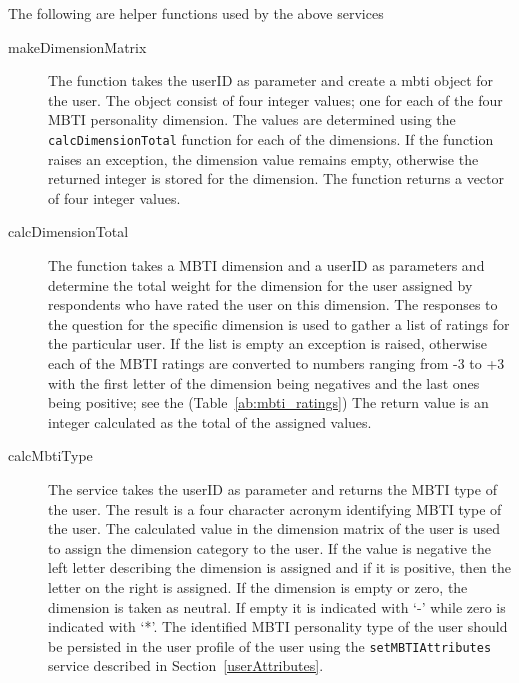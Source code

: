 The following are helper functions used by the above services
\begin{description}

\item[makeDimensionMatrix] The function takes the userID as parameter and create a mbti object for the user. The object consist of four integer values; one for each of the four MBTI personality dimension. The values are determined using the \texttt{calcDimensionTotal} function for each of the dimensions. If the function raises an exception, the dimension value remains empty, otherwise the returned integer is stored for the dimension. The function returns a vector of four integer values.

\item[calcDimensionTotal] The function takes a MBTI dimension and a userID as parameters and determine the total weight for the dimension for the user assigned by respondents who have rated the user on this dimension. The responses to the question for the specific dimension is used to gather a list of ratings for the particular user. If the list is empty an exception is raised, otherwise each of the MBTI ratings are converted to numbers ranging from -3 to +3 with the first letter of the dimension being negatives and the last ones being positive; see the (Table~\ref{ab:mbti_ratings})  The return value is an integer calculated as the total of the assigned values.

\item[calcMbtiType] The service takes the userID as parameter and returns the MBTI type of the user. The result is a four character acronym identifying MBTI type of the user. The calculated value in the dimension matrix of the user is used to assign the dimension category to the user. If the value is negative the left letter describing the dimension is assigned and if it is positive, then the letter on the right is assigned. If the dimension is empty or zero, the dimension is taken as neutral. If empty it is indicated with `-' while zero is indicated with `*'.  The identified MBTI personality type of the user should be persisted in the user profile of the user using the \texttt{setMBTIAttributes} service described in Section~\ref{userAttributes}.
\end{description}  


